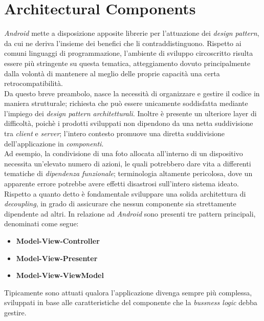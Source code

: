 \documentclass{article}
\begin{document}
\pagestyle{empty}

\section*{Architectural Components}
\large
\textit{Android} mette a disposizione apposite librerie per l'attuazione dei \textit{design pattern}, da cui ne deriva l'insieme dei benefici che li contraddistinguono. Rispetto ai comuni linguaggi di programmazione, l'ambiente di sviluppo circoscritto risulta essere più stringente su questa tematica, atteggiamento dovuto principalmente dalla volontà di mantenere al meglio delle proprie capacità una certa retrocompatibilità.\vspace*{7pt}\\
Da questo breve preambolo, nasce la necessità di organizzare e gestire il codice in maniera strutturale; richiesta che può essere unicamente soddisfatta mediante l'impiego dei \textit{design pattern architetturali}. Inoltre è presente un ulteriore layer di difficoltà, poichè i prodotti sviluppati non dipendono da una netta suddivisione tra \textit{client} e \textit{server}; l'intero contesto promuove una diretta suddivisione dell'applicazione in \textit{componenti}.\vspace*{7pt}\\
Ad esempio, la condivisione di una foto allocata all'interno di un dispositivo necessita un'elevato numero di azioni, le quali potrebbero dare vita a differenti tematiche di \textit{dipendenza funzionale}; terminologia altamente pericolosa, dove un apparente errore potrebbe avere effetti disastrosi sull'intero sistema ideato.\vspace*{7pt}\\
Rispetto a quanto detto è fondamentale sviluppare una solida architettura di \textit{decoupling}, in grado di assicurare che nessun componente sia strettamente dipendente ad altri. In relazione ad \textit{Android} sono presenti tre pattern principali, denominati come segue:
\begin{itemize}[label = {-}]
    \itemsep0em
    \item \textbf{Model-View-Controller}
    \item \textbf{Model-View-Presenter}
    \item \textbf{Model-View-ViewModel}
\end{itemize}
Tipicamente sono attuati qualora l'applicazione divenga sempre più complessa, sviluppati in base alle caratteristiche del componente che la \textit{bussness logic} debba gestire.\vspace*{7pt}\\
\end{document}
